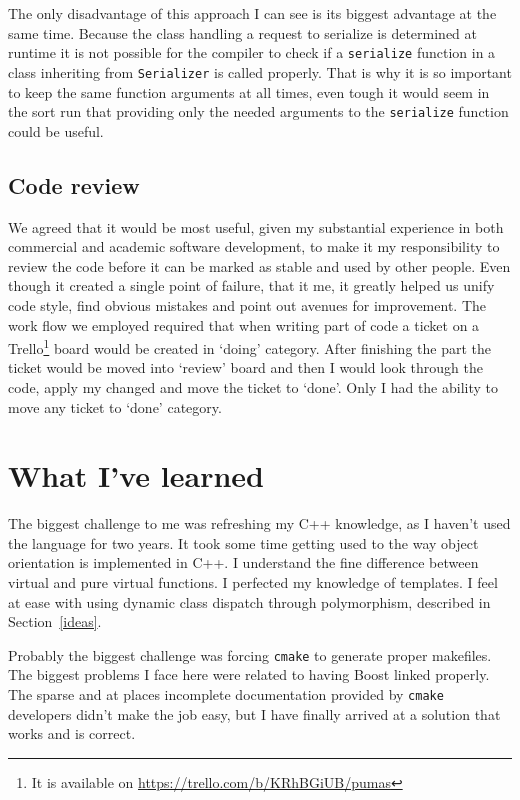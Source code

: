 \documentclass[11pt,a4paper]{article}
\begin{document}
The only disadvantage of this approach I can see is its biggest advantage at the same time. Because the class handling a request to serialize is determined at runtime it is not possible for the compiler to check if a \texttt{serialize} function in a class inheriting from \texttt{Serializer} is called properly. That is why it is so important to keep the same function arguments at all times, even tough it would seem in the sort run that providing only the needed arguments to the \texttt{serialize} function could be useful.

\subsection{Code review}
We agreed that it would be most useful, given my substantial experience in both commercial and academic software development, to make it my responsibility to review the code before it can be marked as stable and used by other people. Even though it created a single point of failure, that it me, it greatly helped us unify code style, find obvious mistakes and point out avenues for improvement. The work flow we employed required that when writing part of code a ticket on a Trello\footnote{It is available on \url{https://trello.com/b/KRhBGiUB/pumas}} board would be created in `doing' category. After finishing the part the ticket would be moved into `review' board and then I would look through the code, apply my changed and move the ticket to `done'. Only I had the ability to move any ticket to `done' category.

\section{What I've learned}
The biggest challenge to me was refreshing my C++ knowledge, as I haven't used the language for two years. It took some time getting used to the way object orientation is implemented in C++. I understand the fine difference between virtual and pure virtual functions. I perfected my knowledge of templates. I feel at ease with using dynamic class dispatch through polymorphism, described in Section~\ref{ideas}.

Probably the biggest challenge was forcing \texttt{cmake} to generate proper makefiles. The biggest problems I face here were related to having Boost linked properly. The sparse and at places incomplete documentation provided by \texttt{cmake} developers didn't make the job easy, but I have finally arrived at a solution that works and is correct.
\end{document}
